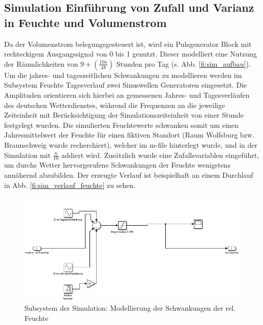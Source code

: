     \subsection{Simulation Einführung von Zufall und Varianz in Feuchte und Volumenstrom}
    Da der Volumenstrom belegungsgesteuert ist, wird ein Pulsgenerator Block mit rechteckigem Ausgangssignal von 0 bis 1 genutzt. Dieser modelliert eine Nutzung der Räumlichkeiten von $9+(\frac{10n}{48})$ Stunden pro Tag (s. Abb. \ref{fi:sim_aufbau}). Um die jahres- und tageszeitlichen Schwankungen zu modellieren werden im Subsystem Feuchte Tagesverlauf zwei Sinuswellen Generatoren eingesetzt. Die Amplituden orientieren sich hierbei an gemessenen Jahres- und Tagesverläufen des deutschen Wetterdienstes, während die Frequenzen an die jeweilige Zeiteinheit mit Berücksichtigung der Simulationszeiteinheit von einer Stunde festgelegt wurden. Die simulierten Feuchtewerte schwanken somit um einen Jahresmittelwert der Feuchte für einen fiktiven Standort (Raum Wolfsburg bzw. Braunschweig wurde recherchiert), welcher im m-file hinterlegt wurde, und in der Simulation mit $\frac{n}{10}$ addiert wird. Zusätzlich wurde eine Zufallsvariablen eingeführt, um durchs Wetter hervorgerufene Schwankungen der Feuchte wenigstens annähernd abzubilden. Der erzeugte Verlauf ist beispielhaft an einem Durchlauf in Abb. \ref{fi:sim_verlauf_feuchte} zu sehen.
    \begin{figure}[H]
        \begin{center}
            \includegraphics[width=0.8\linewidth]{images/sim_feuchteschwank.png}
            \caption[Subsystem Feuchte Tagesverlauf]{Subsystem der Simulation: Modellierung der Schwankungen der rel. Feuchte}
            \label{fi:sim_feuchteschwank}
        \end{center}
    \end{figure}
